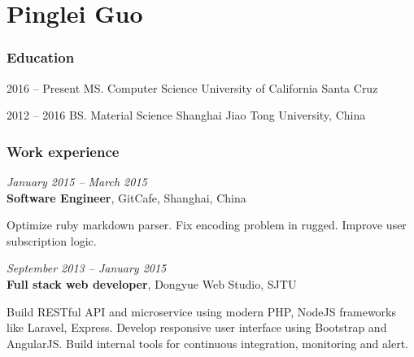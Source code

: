 \documentclass[fontsize=10pt]{tccv}
\begin{document}
\part{Pinglei Guo}

\section{Education}

\begin{yearlist}

\item{2016 -- Present}
     {MS. Computer Science}
     {University of California Santa Cruz}

\item{2012 -- 2016}
     {BS. Material Science}
     {Shanghai Jiao Tong University, China}


\end{yearlist}

\section{Work experience}

\begin{eventlist}



\textit{January 2015 -- March 2015} \\
\textbf{Software Engineer}, GitCafe, Shanghai, China \smallskip

Optimize ruby markdown parser.
Fix encoding problem in rugged.
Improve user subscription logic.

\medskip


\textit{September 2013 -- January 2015} \\
\textbf{Full stack web developer}, Dongyue Web Studio, SJTU\smallskip

Build RESTful API and microservice using modern PHP, NodeJS frameworks like Laravel, Express.
Develop responsive user interface using Bootstrap and AngularJS.
Build internal tools for continuous integration, monitoring and alert.

\end{eventlist}
\end{document}
